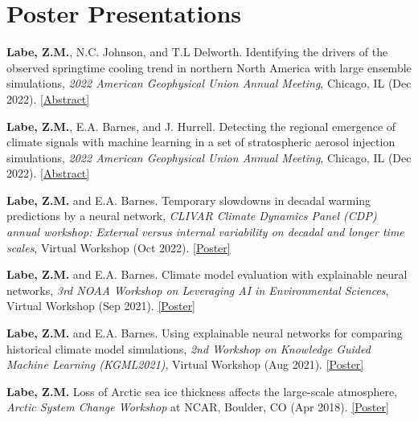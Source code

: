 \documentclass[margin,line,palatino,courier,10pt]{res}
\begin{document}
\begin{resume}
\begin{etaremune}[leftmargin=0in,topsep=0in,parsep=0in]
\end{etaremune}

\section{\sc \textcolor{Cerulean}{\large{\textbf{Poster Presentations}}}}
\begin{etaremune}[leftmargin=0in,topsep=0in,parsep=0in]
\item \textbf{Labe, Z.M.}, N.C. Johnson, and T.L Delworth. Identifying the drivers of the observed springtime cooling trend in northern North America with large ensemble simulations, \textit{2022 American Geophysical Union Annual Meeting}, Chicago, IL (Dec 2022). \href{https://agu.confex.com/agu/fm22/meetingapp.cgi/Paper/1111909}{[Abstract]}
\item \textbf{Labe, Z.M.}, E.A. Barnes, and J. Hurrell. Detecting the regional emergence of climate signals with machine learning in a set of stratospheric aerosol injection simulations, \textit{2022 American Geophysical Union Annual Meeting}, Chicago, IL (Dec 2022). \href{https://agu.confex.com/agu/fm22/meetingapp.cgi/Paper/1110391}{[Abstract]}
\item \textbf{Labe, Z.M.} and E.A. Barnes. Temporary slowdowns in decadal warming predictions by a neural network, \textit{CLIVAR Climate Dynamics Panel (CDP) annual workshop: External versus internal variability on decadal and longer time scales}, Virtual Workshop (Oct 2022). \href{https://zacklabe.files.wordpress.com/2022/09/labebarnes_poster_10-2022.pdf}{[Poster]}
\item \textbf{Labe, Z.M.} and E.A. Barnes. Climate model evaluation with explainable neural networks, \textit{3rd NOAA Workshop on Leveraging AI in Environmental Sciences}, Virtual Workshop (Sep 2021). \href{https://zacklabe.files.wordpress.com/2022/08/b875c-labebarnes_noaa-aies_2021_poster.pdf}{[Poster]}
\item \textbf{Labe, Z.M.} and E.A. Barnes. Using explainable neural networks for comparing historical climate model simulations, \textit{2nd Workshop on Knowledge Guided Machine Learning (KGML2021)}, Virtual Workshop (Aug 2021). \href{https://zacklabe.files.wordpress.com/2022/08/aa648-labebarnes_kgml2021_poster_v2_final.pdf}{[Poster]}
\item \textbf{Labe, Z.M.} Loss of Arctic sea ice thickness affects the large-scale atmosphere, \textit{Arctic System Change Workshop} at NCAR, Boulder, CO (Apr 2018). \href{https://zacklabe.files.wordpress.com/2022/08/ff668-zlabe_042018_bigideaposter.pdf}{[Poster]}

\end{etaremune}
\end{resume}
\end{document}
